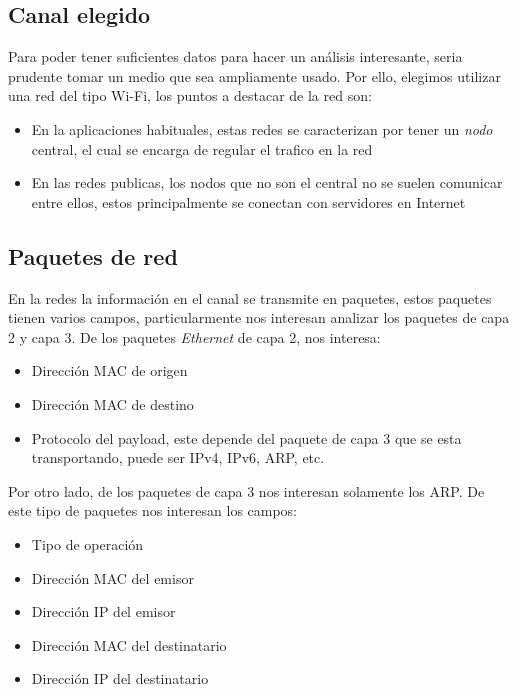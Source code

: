 \subsection{Canal elegido}

Para poder tener suficientes datos para hacer un análisis interesante, seria prudente tomar un medio que sea ampliamente usado. Por ello, elegimos utilizar una red del tipo Wi-Fi, los puntos a destacar de la red son:

\begin{itemize}
	\item En la aplicaciones habituales, estas redes se caracterizan por tener un \textit{nodo} central, el cual se encarga de regular el trafico en la red
	\item En las redes publicas, los nodos que no son el central no se suelen comunicar entre ellos, estos principalmente se conectan con servidores en Internet
\end{itemize}

\subsection{Paquetes de red}

En la redes la información en el canal se transmite en paquetes, estos paquetes tienen varios campos, particularmente nos interesan analizar los paquetes de capa 2 y capa 3. De los paquetes \textit{Ethernet} de capa 2, nos interesa:

\begin{itemize}
	\item Dirección MAC de origen
	\item Dirección MAC de destino
	\item Protocolo del payload, este depende del paquete de capa 3 que se esta transportando, puede ser IPv4, IPv6, ARP, etc.
\end{itemize}

Por otro lado, de los paquetes de capa 3 nos interesan solamente los ARP. De este tipo de paquetes nos interesan los campos:

\begin{itemize}
	\item Tipo de operación
	\item Dirección MAC del emisor
	\item Dirección IP del emisor
	\item Dirección MAC del destinatario
	\item Dirección IP del destinatario
\end{itemize}

